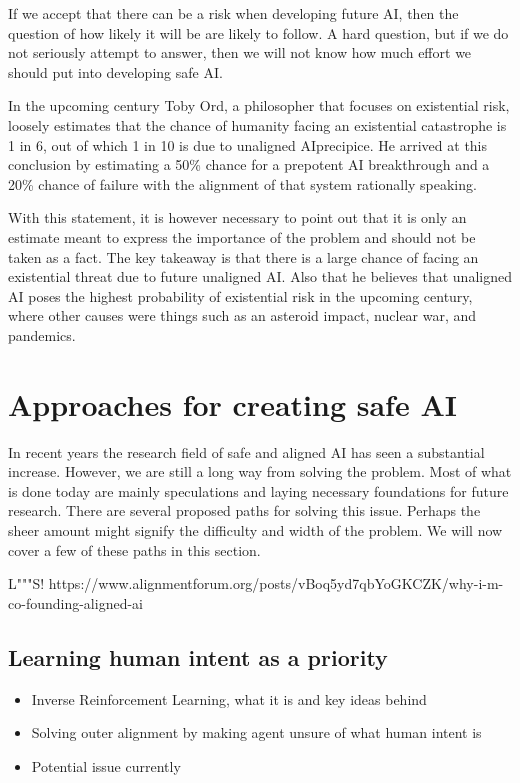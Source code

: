 \documentclass[12pt,A4]{report}
\newcommand{\autobaj}{}
\theoremstyle{definition}
\begin{document}
If we accept that there can be a risk when developing future AI, then the question of how likely it will be are likely to follow. A hard question, but if we do not seriously attempt to answer, then we will not know how much effort we should put into developing safe AI. 

In the upcoming century Toby Ord, a philosopher that focuses on existential risk, loosely estimates that the chance of humanity facing an existential catastrophe is 1 in 6, out of which 1 in 10 is due to unaligned AI\autobaj{precipice}. He arrived at this conclusion by estimating a 50\% chance for a prepotent AI breakthrough and a 20\% chance of failure with the alignment of that system \autobaj{rationally speaking}. 

With this statement, it is however necessary to point out that it is only an estimate meant to express the importance of the problem and should not be taken as a fact. The key takeaway is that there is a large chance of facing an existential threat due to future unaligned AI. Also that he believes that unaligned AI poses the highest probability of existential risk in the upcoming century, where other causes were things such as an asteroid impact, nuclear war, and pandemics. 


\section{Approaches for creating safe AI}
In recent years the research field of safe and aligned AI has seen a substantial increase. However, we are still a long way from solving the problem. Most of what is done today are mainly speculations and laying necessary foundations for future research. There are several proposed paths for solving this issue. Perhaps the sheer amount might signify the difficulty and width of the problem. We will now cover a few of these paths in this section.

L"""S!
https://www.alignmentforum.org/posts/vBoq5yd7qbYoGKCZK/why-i-m-co-founding-aligned-ai
\subsection{Learning human intent as a priority}
\begin{itemize}
    \item Inverse Reinforcement Learning, what it is and key ideas behind
    \item Solving outer alignment by making agent unsure of what human intent is
    \item Potential issue currently

\end{itemize}
\end{document}

